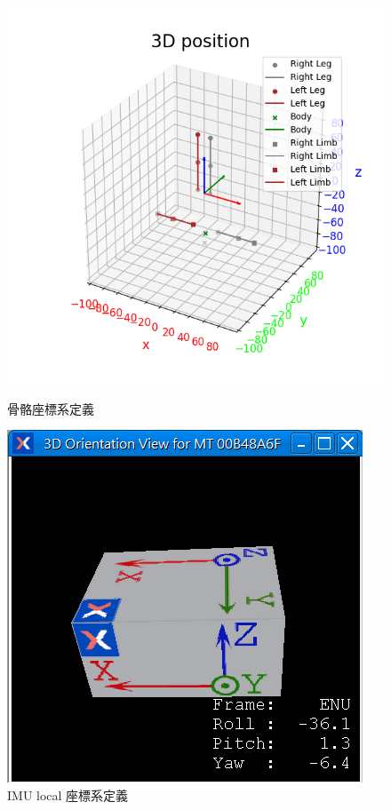 \begin{figure}[!ht]
   \centering
   \begin{minipage}{.5\textwidth}
     \centering
     \includegraphics[width=.8\linewidth]{figure/ch3_fig_skeleton_frame.png}
     \caption[骨骼座標系定義]{骨骼座標系定義}
     \label{ch3_fig_skeleton_frame}
   \end{minipage}%
   \begin{minipage}{.5\textwidth}
     \centering
     \includegraphics[width=.8\linewidth]{figure/ch3_fig_imu_frame.png}
     \caption[IMU local 座標系定義]{IMU local 座標系定義}
     \label{ch3_fig_imu_frame}
   \end{minipage}
\end{figure}

